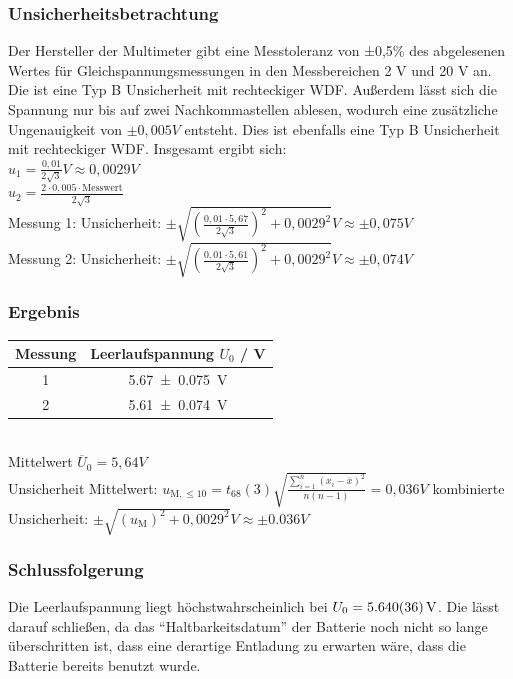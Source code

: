 \documentclass[
	a4paper,
	12pt,
	pagesize,
	ngerman
]{scrartcl}
\begin{document}
	\subsubsection{Unsicherheitsbetrachtung}
	Der Hersteller der Multimeter gibt eine Messtoleranz von ±0,5\% des abgelesenen Wertes für Gleichspannungsmessungen in den Messbereichen 2 V und 20 V an. Die ist eine Typ B Unsicherheit mit rechteckiger WDF. Außerdem lässt sich die Spannung nur bis auf zwei Nachkommastellen ablesen, wodurch eine zusätzliche Ungenauigkeit von $\pm 0,005\si{V}$ entsteht. Dies ist ebenfalls eine Typ B Unsicherheit mit rechteckiger WDF. Insgesamt ergibt sich: \\
	$u_1= \frac{0,01}{2\sqrt{3}} \si{V} \approx 0,0029 \si{V}$ \\
	$u_2= \frac{2 \cdot 0,005 \cdot \text{Messwert}}{2 \sqrt{3}}$ \\ %
	Messung 1: Unsicherheit: $\pm \sqrt{(\frac{0,01 \cdot 5,67}{2 \sqrt{3}})^2 + 0,0029^2} \si{V} \approx \pm 0,075 \si{V}$ \\
	Messung 2: Unsicherheit: $\pm \sqrt{(\frac{0,01 \cdot 5,61}{2 \sqrt{3}})^2 + 0,0029^2} \si{V} \approx \pm 0,074 \si{V}$ 
	
	\subsubsection{Ergebnis}
	\begin{tabular}{| c | c |}
		\hline
	Messung & Leerlaufspannung $U_0$ / \si{V}\\ \hline
	1 & \SI{5,67 +- 0,075}{\V}\\ %
	2 & \SI{5,61 +- 0,074}{\V}\\ \hline
	\end{tabular} \\
	Mittelwert $\overline{U}_0= 5,64 \si{V}$ \\
	Unsicherheit Mittelwert: $u_{\text{M},\leq10}=t_{68}(3)\sqrt{\frac{\sum_{i=1}^{n} (x_i-\overline{x})^2}{n(n-1)}}=0,036 \si{V}$ \newline
	kombinierte Unsicherheit: $\pm \sqrt{(u_\text{M})^2 + 0,0029^2} \si{V} \approx \pm 0.036 \si{V}$ 
	\subsubsection{Schlussfolgerung}
	Die Leerlaufspannung liegt höchstwahrscheinlich bei $U_0=\SI{5,64 \pm 0.036}{V}$. Die lässt darauf schließen, da das \enquote{Haltbarkeitsdatum} der Batterie noch nicht so lange überschritten ist, dass eine derartige Entladung zu erwarten wäre, dass die Batterie bereits benutzt wurde. %
	
\end{document}
